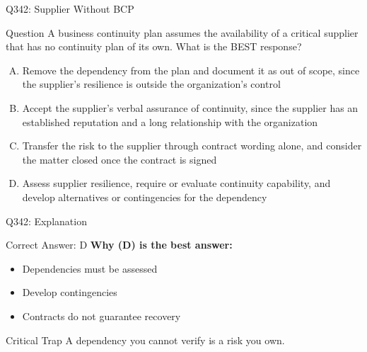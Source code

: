 \documentclass{beamer}
\begin{document}
	\begin{frame}{Q342: Supplier Without BCP}
		\begin{block}{Question}
			\small A business continuity plan assumes the availability of a critical supplier that has no continuity plan of its own. What is the BEST response?
		\end{block}
		\begin{enumerate}[(A)]
			\footnotesize
			\item Remove the dependency from the plan and document it as out of scope, since the supplier's resilience is outside the organization's control
			\item Accept the supplier's verbal assurance of continuity, since the supplier has an established reputation and a long relationship with the organization
			\item Transfer the risk to the supplier through contract wording alone, and consider the matter closed once the contract is signed
			\item Assess supplier resilience, require or evaluate continuity capability, and develop alternatives or contingencies for the dependency
		\end{enumerate}
	\end{frame}
	
	\begin{frame}{Q342: Explanation}
		\begin{block}{Correct Answer: D}
			\textbf{Why (D) is the best answer:}
			\begin{itemize}
				\item Dependencies must be assessed
				\item Develop contingencies
				\item Contracts do not guarantee recovery
			\end{itemize}
		\end{block}
		\begin{alertblock}{Critical Trap}
			A dependency you cannot verify is a risk you own.
		\end{alertblock}
	\end{frame}
	
\end{document}
